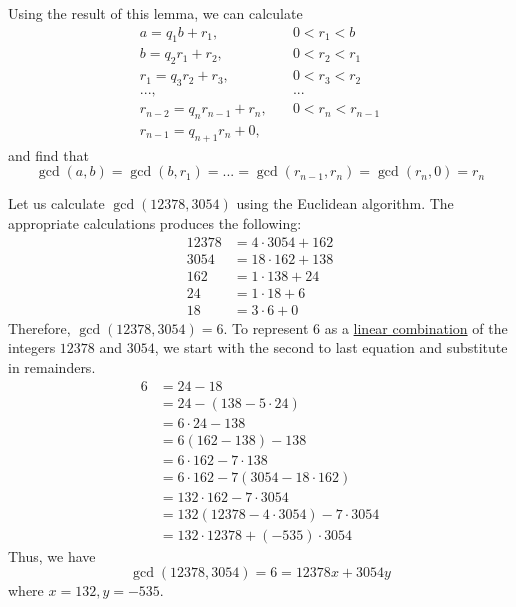 \documentclass{article}
\newcounter{example}[section]
\begin{document}
Using the result of this lemma, we can calculate 
\begin{align*}
    a = q_1 b + r_1, \quad & 0 < r_1 < b \\
    b = q_2 r_1 + r_2 , \quad & 0 < r_2 < r_1 \\
    r_1 = q_3 r_2 + r_3 , \quad & 0 < r_3 < r_2 \\
    ... , \quad & ... \\
    r_{n-2} = q_n r_{n-1} + r_n , \quad & 0 < r_n < r_{n-1} \\
    r_{n-1} = q_{n+1} r_n + 0, \quad &
\end{align*}
and find that
\begin{equation}
  \gcd(a, b) = \gcd(b, r_1) = ... = \gcd(r_{n-1}, r_n) = \gcd(r_n, 0) = r_n
\end{equation}

\begin{example}
  \label{ex:euclidean-algorithm-computation}
Let us calculate $\gcd(12378, 3054)$ using the Euclidean algorithm. The appropriate calculations produces the following: 
\begin{align*}
    12378 & = 4 \cdot 3054 + 162 \\ 
    3054 & = 18 \cdot 162 + 138 \\
    162 & = 1 \cdot 138 + 24 \\
    24 & = 1 \cdot 18 + 6 \\
    18 & = 3 \cdot 6 + 0
\end{align*}
Therefore, $\gcd(12378, 3054) = 6$. To represent $6$ as a \hyperref[lin-def:linear-combination]{linear combination} of the integers $12378$ and $3054$, we start with the second to last equation and substitute in remainders.
\begin{align*}
    6 & = 24 - 18 \\
    & = 24 - (138 - 5 \cdot 24) \\
    & = 6 \cdot 24 - 138 \\
    & = 6 (162 - 138) - 138 \\
    & = 6 \cdot 162 - 7 \cdot 138 \\
    & = 6 \cdot 162 - 7 (3054 - 18 \cdot 162) \\
    & = 132 \cdot 162 - 7 \cdot 3054 \\
    & = 132(12378 - 4 \cdot 3054) - 7 \cdot 3054 \\
    & = 132 \cdot 12378 + (-535) \cdot 3054
\end{align*}
Thus, we have 
\begin{equation}
  \gcd(12378, 3054) = 6 = 12378 x + 3054 y
\end{equation}
where $x = 132, y = -535$. 
\end{example}
\end{document}
